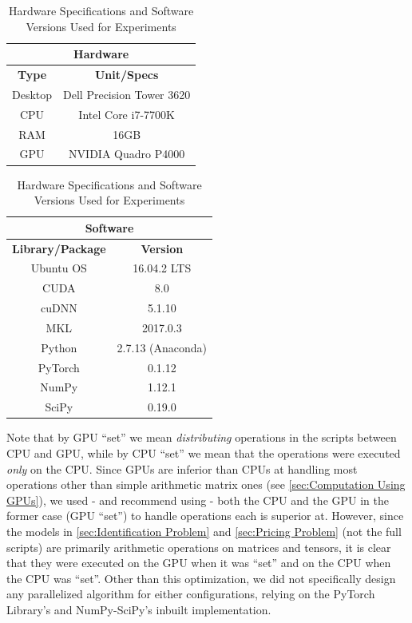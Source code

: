 \documentclass[12pt]{article}
\begin{document}
    \begin{table}[!htbp]
        \centering
        \caption{Hardware Specifications and Software Versions Used for Experiments}
        \label{tab:Hardware Specifications and Software Versions Used for Experiments}
        \begin{tabular}{|c|c|}
            \hline
            \multicolumn{2}{c}{\textbf{Hardware}}\\
            \hline
            \textbf{Type} & \textbf{Unit/Specs}\\
            \hline
            Desktop & Dell Precision Tower 3620\\
            CPU & Intel Core i7-7700K\\
            RAM & 16GB\\
            GPU & NVIDIA Quadro P4000\\
            \hline
        \end{tabular}\quad
        \begin{tabular}{|c|c|}
            \hline
            \multicolumn{2}{c}{\textbf{Software}}\\
            \hline
            \textbf{Library/Package} & \textbf{Version}\\
            \hline
            Ubuntu OS & 16.04.2 LTS\\
            CUDA & 8.0\\
            cuDNN & 5.1.10\\
            MKL & 2017.0.3\\
            Python & 2.7.13 (Anaconda)\\
            PyTorch & 0.1.12\textunderscore2\\
            NumPy & 1.12.1\\
            SciPy & 0.19.0\\
            \hline
        \end{tabular}
    \end{table}
    
    Note that by GPU ``set'' we mean \textit{distributing} operations in the scripts between CPU and GPU, while by CPU ``set'' we mean that the operations were executed \textit{only} on the CPU. Since GPUs are inferior than CPUs at handling most operations other than simple arithmetic matrix ones (see \cref{sec:Computation Using GPUs}), we used - and recommend using - both the CPU and the GPU in the former case (GPU ``set'') to handle operations each is superior at. However, since the models in \cref{sec:Identification Problem} and \cref{sec:Pricing Problem} (not the full scripts) are primarily arithmetic operations on matrices and tensors, it is clear that they were executed on the GPU when it was ``set'' and on the CPU when the CPU was ``set''. Other than this optimization, we did not specifically design any parallelized algorithm for either configurations, relying on the PyTorch Library's and NumPy-SciPy's inbuilt implementation.
    
\end{document}
